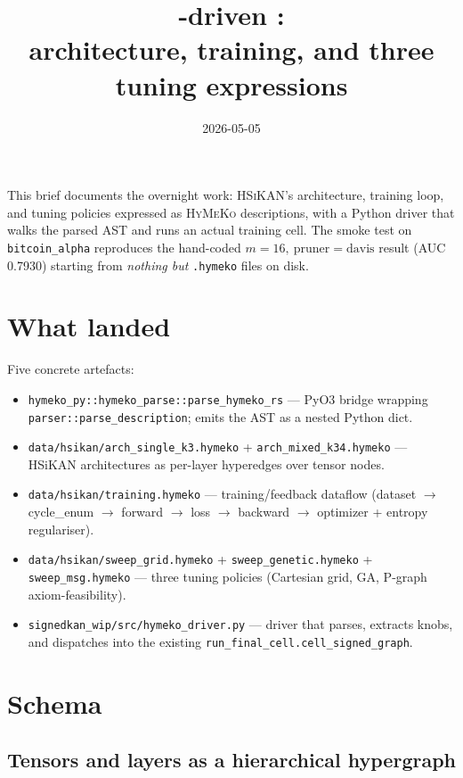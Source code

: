 \documentclass[11pt,a4paper]{article}
\title{\HyMeKo-driven \HSiKAN: \\[2pt]
       \large{\normalfont architecture, training, and three tuning expressions}}
\author{}
\date{2026-05-05}
\newcommand{\HSiKAN}{\textsc{HSiKAN}}
\newcommand{\HyMeKo}{\textsc{HyMeKo}}
\newcommand{\code}[1]{\texttt{\small #1}}
\begin{document}
\maketitle

\noindent
This brief documents the overnight work: \HSiKAN{}'s architecture,
training loop, and tuning policies expressed as \HyMeKo{}
descriptions, with a Python driver that walks the parsed AST and
runs an actual training cell. The smoke test on
\code{bitcoin\_alpha} reproduces the hand-coded
$m{=}16,\ \text{pruner}{=}\text{davis}$ result (AUC 0.7930) starting
from \emph{nothing but} \code{.hymeko} files on disk.

\section{What landed}

Five concrete artefacts:

\begin{itemize}
\item \code{hymeko\_py::hymeko\_parse::parse\_hymeko\_rs} --- PyO3
      bridge wrapping \code{parser::parse\_description}; emits the
      AST as a nested Python dict.
\item \code{data/hsikan/arch\_single\_k3.hymeko} +
      \code{arch\_mixed\_k34.hymeko} --- HSiKAN architectures as
      per-layer hyperedges over tensor nodes.
\item \code{data/hsikan/training.hymeko} --- training/feedback
      dataflow (dataset $\to$ cycle\_enum $\to$ forward $\to$ loss
      $\to$ backward $\to$ optimizer + entropy regulariser).
\item \code{data/hsikan/sweep\_grid.hymeko} +
      \code{sweep\_genetic.hymeko} +
      \code{sweep\_msg.hymeko} --- three tuning policies (Cartesian
      grid, GA, P-graph axiom-feasibility).
\item \code{signedkan\_wip/src/hymeko\_driver.py} --- driver that
      parses, extracts knobs, and dispatches into the existing
      \code{run\_final\_cell.cell\_signed\_graph}.
\end{itemize}

\section{Schema}

\subsection{Tensors and layers as a hierarchical hypergraph}
\end{document}
